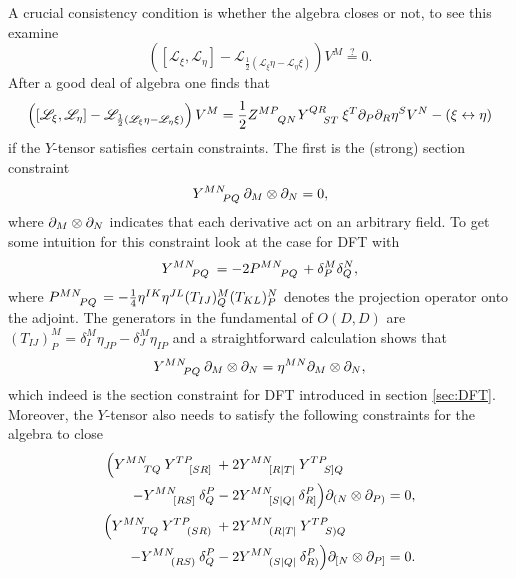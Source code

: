 A crucial consistency condition is whether the algebra closes or not, to see this examine 
\begin{equation}\label{eq:closure}
    \left(\left[\mathscr{L}_\xi,\mathscr{L}_\eta\right]-\mathscr{L}_{\frac{1}{2}\left(\mathscr{L}_\xi\eta-\mathscr{L}_\eta\xi\right)}\right)V^M\overset{?}{=}0.
\end{equation}
After a good deal of algebra one finds that 
\begin{equation}\label{eq:GenDiffComm}
    \left(\left[\mathscr{L}_\xi,\mathscr{L}_\eta\right]-\mathscr{L}_{\frac{1}{2}\left(\mathscr{L}_\xi\eta-\mathscr{L}_\eta\xi\right)}\right)V^M = \frac{1}{2}\tensor{Z}{^{MP}_{QN}}\tensor{Y}{^{QR}_{ST}}\xi^T\pd_P\pd_R\eta^SV^N-\left(\xi\leftrightarrow\eta\right)
\end{equation}
if the $Y$-tensor satisfies certain constraints. The first is the (strong) section constraint 
\begin{equation}
    \tensor{Y}{^{MN}_{PQ}}\pd_M\otimes\pd_N = 0,
\end{equation}
where $\partial_M\otimes\partial_N$ indicates that each derivative act on an arbitrary field. To get some intuition for this constraint look at the case for DFT with
\begin{equation}
    \tensor{Y}{^{MN}_{PQ}}=-2\tensor{P}{^{MN}_{PQ}}+\delta^M_P\delta^N_Q,
\end{equation}
where $\tensor{P}{^{MN}_{PQ}}=-\frac{1}{4}\eta^{IK}\eta^{JL}(T_{IJ})^M_Q(T_{KL})^N_P$ denotes the projection operator onto the adjoint. The generators in the fundamental of $O(D,D)$ \cite{Berman2014} are $(T_{IJ})^M_P=\delta^M_I\eta_{JP}-\delta_J^M\eta_{IP}$ and a straightforward calculation shows that 
\begin{equation}\label{eq:section}
    \tensor{Y}{^{MN}_{PQ}}\pd_M\otimes\pd_N = \eta^{MN}\pd_M\otimes\pd_N,
\end{equation}
which indeed is the section constraint for DFT introduced in section \ref{sec:DFT}. Moreover, the $Y$-tensor also needs to satisfy the following constraints for the algebra to close
\begin{subequations}
    \begin{align}
        \begin{split}
        \Big(\tensor{Y}{^{MN}_{TQ}}\tensor{Y}{^{TP}_{[SR]}}&+2\tensor{Y}{^{MN}_{[R|T|}}\tensor{Y}{^{TP}_{S]Q}}\\
        -\tensor{Y}{^{MN}_{[RS]}}\delta^P_Q&-2\tensor{Y}{^{MN}_{[S|Q|}}\delta_{R]}^P\Big)\pd_{(N}\otimes\pd_{P)}=0,
        \end{split}\label{eq:closure1}
        \\
        \begin{split}
        \Big(\tensor{Y}{^{MN}_{TQ}}\tensor{Y}{^{TP}_{(SR)}}&+2\tensor{Y}{^{MN}_{(R|T|}}\tensor{Y}{^{TP}_{S)Q}}\\
        -\tensor{Y}{^{MN}_{(RS)}}\delta^P_Q&-2\tensor{Y}{^{MN}_{(S|Q|}}\delta_{R)}^P\Big)\pd_{[N}\otimes\pd_{P]}=0.
        \end{split}\label{eq:closure2}
    \end{align}
    \end{subequations}


